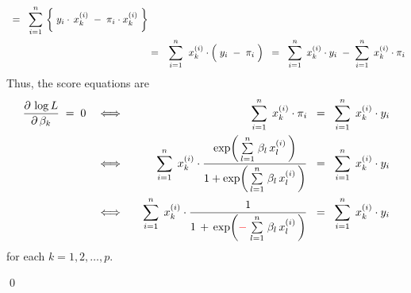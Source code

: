 \begin{enumerate}
\begin{eqnarray*}
	\;\; = \;\;
		\overset{n}{\underset{i=1}{\sum}}\,
		\left\{\;
			y_{i}\cdot\,x^{(i)}_{k}
			\; \overset{{\color{white}\vert}}{-} \;
			\pi_{i} \cdot x^{(i)}_{k}
			\;\right\}	
	\\
	&=&
		\overset{n}{\underset{i=1}{\sum}}\;\;
		x^{(i)}_{k}	
		\cdot
		\left(\; y_{i} \; \overset{{\color{white}.}}{-} \; \pi_{i} \;\right)
	\;\; = \;\;
		\overset{n}{\underset{i=1}{\sum}}\;\, x^{(i)}_{k} \cdot y_{i}
		\; - \;
		\overset{n}{\underset{i=1}{\sum}}\;\, x^{(i)}_{k} \cdot \pi_{i}
	\end{eqnarray*}
	Thus, the score equations are
	\begin{eqnarray*}
	\dfrac{\partial\,\log L}{\partial\,\beta_{k}} \;=\; 0
	&\quad\Longleftrightarrow\quad&
		\overset{n}{\underset{i=1}{\sum}}\;\, x^{(i)}_{k} \cdot \pi_{i}
		\;\; = \;\;
		\overset{n}{\underset{i=1}{\sum}}\;\, x^{(i)}_{k} \cdot y_{i}
	\\
	&\quad\Longleftrightarrow\quad&
		\overset{n}{\underset{i=1}{\sum}}\;\, x^{(i)}_{k} \cdot
		\dfrac{
			\exp\!\left(\,\overset{n}{\underset{l=1}{\sum}}\;\beta_{l}\,x^{(i)}_{l}\,\right)
			}{
			1 + \exp\!\left(\,\overset{n}{\underset{l=1}{\sum}}\;\beta_{l}\,x^{(i)}_{l}\,\right)
			}
		\;\; = \;\;
		\overset{n}{\underset{i=1}{\sum}}\;\, x^{(i)}_{k} \cdot y_{i}
	\\
	&\quad\Longleftrightarrow\quad&
		\overset{n}{\underset{i=1}{\sum}}\;\, x^{(i)}_{k} \cdot
		\dfrac{1}{1 \,+\, \exp\!\left({\color{red}-}\;\overset{n}{\underset{l=1}{\sum}}\;\beta_{l}\,x^{(i)}_{l}\,\right)}
		\;\; = \;\;
		\overset{n}{\underset{i=1}{\sum}}\;\, x^{(i)}_{k} \cdot y_{i}
	\end{eqnarray*}
	for each $k = 1,2,\ldots,p$.
\end{enumerate}
\qed


\renewcommand{\theenumi}{\roman{enumi}}
\renewcommand{\labelenumi}{\textnormal{(\theenumi)}$\;\;$}

